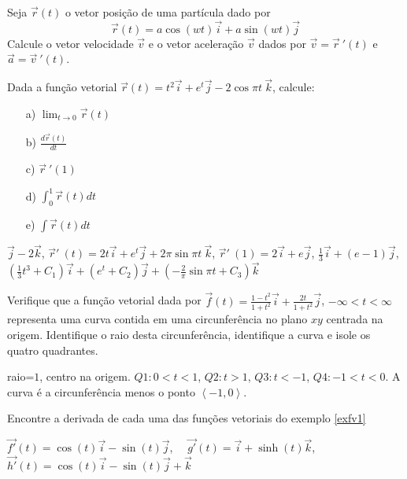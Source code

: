 \begin{exer}Seja $\vec{r}(t)$ o vetor posição de uma partícula dado por
$$\vec{r}(t)=a\cos(wt)\vec{i}+a\sin(wt)\vec{j}$$
Calcule o vetor velocidade $\vec{v}$ e o vetor aceleração $\vec{v}$ dados por $\vec{v}=\vec{r}~\!'(t)$ e $\vec{a}=\vec{v}~\!'(t)$.
\end{exer}

\begin{exer} Dada a função vetorial $\vec{r}(t)=t^2\vec{i}+e^t\vec{j}-2\cos\pi t ~\! \vec{k}$, calcule:
\begin{itemize}
\item [a)] $\displaystyle \lim_{t\to 0} \vec{r}(t)$
\item [b)] $\displaystyle \frac{d \vec{r}(t)}{dt}$
\item [c)] $\displaystyle \vec{r}~\!'(1)$
\item [d)] $\displaystyle \int_0^1 \vec{r}(t)dt$
\item [e)] $\displaystyle \int \vec{r}(t)dt$
\end{itemize}
\end{exer}
\begin{resp} $\vec{j}-2\vec{k}$, $\vec{r}'\!~(t)=2t\vec{i}+e^t\vec{j}+2\pi\sin\pi t ~\! \vec{k}$, $\vec{r}'\!~(1)=2\vec{i}+e\vec{j}$, $\frac{1}{3}\vec{i}+(e-1)\vec{j}$, $\left(\frac{1}{3}t^3+C_1\right)\vec{i}+\left(e^t+C_2\right)\vec{j}+\left(-\frac{2}{\pi}\sin\pi t+C_3\right)\vec{k}$
\end{resp}

\begin{exer} Verifique que a função vetorial dada por $\vec{f}(t)=\frac{1-t^2}{1+t^2}\vec{i}+\frac{2t}{1+t^2}\vec{j}$, $-\infty<t<\infty$
representa uma curva contida em uma circunferência no plano $xy$  centrada na origem. Identifique o raio desta circunferência, identifique a curva e isole os quatro quadrantes.
\end{exer}

\begin{resp}raio=$1$, centro na origem. $Q1: 0<t<1$, $Q2:t>1$, $Q3:t<-1$, $Q4:-1<t<0$. A curva é a circunferência menos o ponto $\left<-1,0\right>$.
\end{resp}


\begin{exer}Encontre a derivada de cada uma das funções vetoriais do exemplo \ref{exfv1}
\end{exer}

\begin{resp} $\vec{f'}(t)=\cos(t)\vec{i}-\sin(t)\vec{j}$,~~ $\vec{g'}(t)= \vec{i}+\sinh(t)\vec{k}$, ~~$\vec{h'}(t)=\cos(t)\vec{i}-\sin(t)\vec{j}+\vec{k}$\end{resp}


